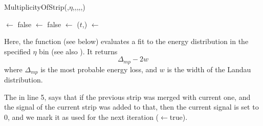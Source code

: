 \documentclass[11pt]{article}
\begin{document}
\begin{function}[htbp]
  \caption{MultiplicityOfStrip(,$\eta$,,,,,)} 
  \label{func:MultiplicityOfStrip}
   {
    \usedThis $\leftarrow$ false\;
    \usedPrev $\leftarrow$ false\;
  }
  \highCut $\leftarrow$ \GetHighCut($t$,\Eta)\;
  \total $\leftarrow$ \Current\;
\end{function}
Here, the function  (see below) evaluates a fit to the energy
distribution in the specified $\eta$ bin (see also
).  It returns
$$
\Delta_{mp} - 2 w
$$
where $\Delta_{mp}$ is the most probable energy loss, and $w$ is the
width of the Landau distribution.  

The  in line 5, says that if the previous strip was merged
with current one, and the signal of the current strip was added to
that, then the current signal is set to 0, and we mark it as used for
the next iteration ($\leftarrow$true).

\end{document}
